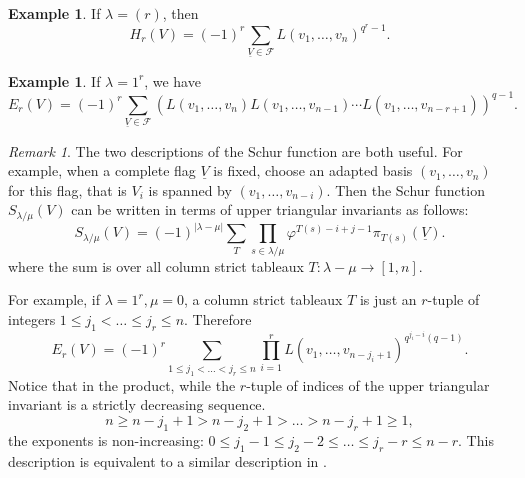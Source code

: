\documentclass[12pt,a4paper]{report}
\theoremstyle{definition}
\theoremstyle{remark}
\newtheorem*{remark}{Remark}
\theoremstyle{definition}
\newtheorem{example}[theorem]{Example}
\begin{document}
 \begin{example} If $\lambda = (r)$, then 
 \begin{equation*}
 H_r (V) = (-1)^r \sum_{\underline{V} \in \mathcal{F}} L(v_1, \ldots, v_n)^{q^r-1}. 
 \end{equation*}   
 \end{example}
\begin{example}
If $\lambda = 1^r$, we have 
\begin{equation*}
E_r (V) = (-1)^r\sum_{\underline{V} \in \mathcal{F}} (L(v_1, \ldots, v_n) L(v_1, \ldots, v_{n-1}) \cdots L(v_1, \ldots, v_{n-r+1}))^{q-1}.
\end{equation*}
\end{example}
 \begin{remark}
The two descriptions of the Schur function are both useful. For example, when a complete flag $\underline{V}$ is fixed, choose an adapted basis $(v_1, \ldots, v_n)$ for this flag, that is $V_i$ is spanned by $(v_1, \ldots, v_{n-i})$. Then the Schur function $S_{\lambda/\mu} (V)$ can be written in terms of upper triangular invariants as follows: 
\begin{equation*}
S_{\lambda/\mu} (V) = (-1)^{|\lambda - \mu|} \sum_T \prod_{s \in \lambda/\mu} \varphi^{T(s) -i+j-1} \pi_{T(s)} (\underline{V}). 
\end{equation*}
where the sum is over all column strict tableaux $T \colon \lambda - \mu \to [1,n]$.

For example, if $\lambda = 1^r, \mu = 0$, a column strict tableaux $T$ is just an $r$-tuple of integers $1 \leq j_1 < \ldots \leq j_r \leq n$. Therefore
\begin{equation*}
E_r (V) = (-1)^r \sum_{1 \leq j_1 < \ldots <j_r \leq n} \prod_{i=1}^r L(v_1, \ldots, v_{n-j_i+1})^{q^{j_i-i}(q-1)}. 
\end{equation*}
Notice that in the product, while the $r$-tuple of indices of the upper triangular invariant is a strictly decreasing sequence.
\begin{equation*}
n \geq n-j_1 +1 > n-j_2 +1 > \ldots > n-j_r +1 \geq 1,
\end{equation*}
the exponents is non-increasing: $0 \leq j_1-1 \leq j_2-2 \leq \ldots \leq j_r-r \leq n-r$. This description is equivalent to a similar description in \cite[Theorem 4.3]{Campbell1996}. 
 \end{remark}
\end{document}
